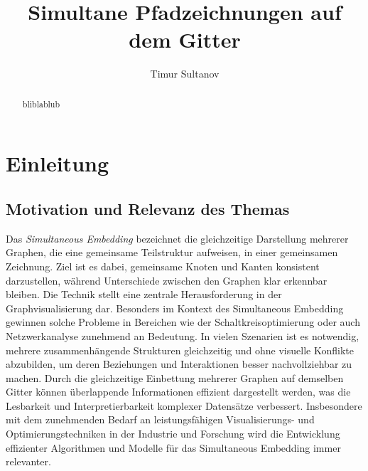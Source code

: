 \documentclass[bachelor, german]{algothesis}
\title{Simultane Pfadzeichnungen auf dem Gitter} %
\author{Timur Sultanov} %
\begin{document}
\begin{abstract}
bliblablub
\end{abstract}

\thesistableofcontents

\chapter{Einleitung}
\section{Motivation und Relevanz des Themas}
Das \textit{Simultaneous Embedding} bezeichnet die gleichzeitige Darstellung mehrerer Graphen, die eine gemeinsame Teilstruktur aufweisen, in einer gemeinsamen Zeichnung. Ziel ist es dabei, gemeinsame Knoten und Kanten konsistent darzustellen, während Unterschiede zwischen den Graphen klar erkennbar bleiben. Die Technik stellt eine zentrale Herausforderung in der Graphvisualisierung dar. Besonders im Kontext des Simultaneous Embedding gewinnen solche Probleme in Bereichen wie der Schaltkreisoptimierung oder auch Netzwerkanalyse zunehmend an Bedeutung. In vielen Szenarien ist es notwendig, mehrere zusammenhängende Strukturen gleichzeitig und ohne visuelle Konflikte abzubilden, um deren Beziehungen und Interaktionen besser nachvollziehbar zu machen.\newline
Durch die gleichzeitige Einbettung mehrerer Graphen auf demselben Gitter können überlappende Informationen effizient dargestellt werden, was die Lesbarkeit und Interpretierbarkeit komplexer Datensätze verbessert.  Insbesondere mit dem zunehmenden Bedarf an leistungsfähigen Visualisierungs- und Optimierungstechniken in der Industrie und Forschung wird die Entwicklung effizienter Algorithmen und Modelle für das Simultaneous Embedding immer relevanter.
\end{document}
